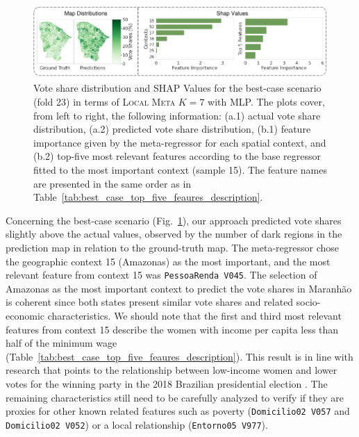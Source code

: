 \documentclass[runningheads]{llncs}
\begin{document}
\begin{figure}[!ht]
    \centering
    \includegraphics[page=1, width=\linewidth]{shap_values_lv.pdf}
    \caption{Vote share distribution and SHAP Values for the best-case scenario (fold 23) in terms of \textsc{Local Meta $K=7$} with MLP. The plots cover, from left to right, the following information: (a.1) actual vote share distribution, (a.2) predicted vote share distribution, (b.1) feature importance given by the meta-regressor for each spatial context, and (b.2) top-five most relevant features according to the base regressor fitted to the most important context (sample 15). The feature names are presented in the same order as in Table~\ref{tab:best_case_top_five_feaures_description}.}
    \label{fig:shap_values_best_case}
\end{figure}
Concerning the best-case scenario (Fig.~\ref{fig:shap_values_best_case}), our approach predicted vote shares slightly above the actual values, observed by the number of dark regions in the prediction map in relation to the ground-truth map. The meta-regressor chose the geographic context 15 (Amazonas) as the most important, and the most relevant feature from context 15 was \texttt{PessoaRenda V045}. The selection of Amazonas as the most important context to predict the vote shares in Maranhão is coherent since both states present similar vote shares and related socio-economic characteristics. We should note that the first and third most relevant features from context 15 describe the women with income per capita less than half of the minimum wage (Table~\ref{tab:best_case_top_five_feaures_description}). This result is in line with research that points to the relationship between low-income women and lower votes for the winning party in the 2018 Brazilian presidential election \cite{layton2021demographic,pinheiro2020hope}. The remaining characteristics still need to be carefully analyzed to verify if they are proxies for other known related features such as poverty (\texttt{Domicilio02 V057} and \texttt{Domicilio02 V052}) or a local relationship (\texttt{Entorno05 V977}).
\end{document}
